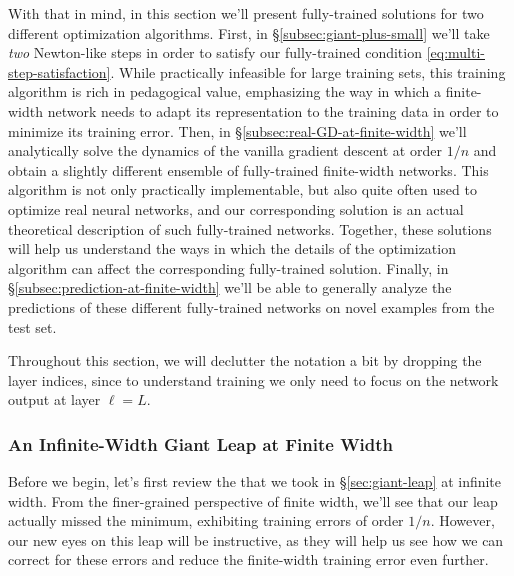 With that in mind, in this section we'll present fully-trained solutions for two different optimization algorithms. First, in \S\ref{subsec:giant-plus-small}
we'll take \emph{two} Newton-like steps in order to satisfy our fully-trained condition \eqref{eq:multi-step-satisfaction}. While practically infeasible for large training sets, this training algorithm is rich in pedagogical value, emphasizing the way in which a finite-width network needs to adapt its representation to the training data in order to minimize its training error. Then, in \S\ref{subsec:real-GD-at-finite-width} we'll analytically solve the dynamics of the vanilla gradient descent at order $1/n$ and obtain a slightly different ensemble of fully-trained finite-width networks. This algorithm is not only practically implementable, but also quite often used to optimize real neural networks, and our corresponding solution is an actual theoretical description of such fully-trained networks. Together, these solutions will help us understand the ways in which the details of the optimization algorithm can affect the corresponding fully-trained solution. Finally, in 
\S\ref{subsec:prediction-at-finite-width}
we'll be able to generally analyze the predictions of these different fully-trained networks on novel examples from the test set.







Throughout this section, we will declutter the notation a bit by dropping the layer indices, since to understand training we only need to focus on the network output at layer $\ell=L$.







\subsubsection{An Infinite-Width Giant Leap at Finite Width}
Before we begin, let's first review the  that we took in \S\ref{sec:giant-leap} at infinite width. From the finer-grained perspective of finite width, we'll see that our leap actually missed the minimum, exhibiting training errors of order $1/n$. However, our new eyes on this leap will be instructive, as they will help us see how we can correct for these errors and reduce the finite-width training error even further. 


